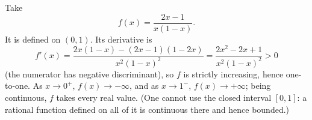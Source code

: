 Take
\[f(x)=\dfrac{2x-1}{x(1-x)}.\]
It is defined on $(0,1)$. Its derivative is
\[f'(x)=\dfrac{2x(1-x)-(2x-1)(1-2x)}{x^2(1-x)^2}=\dfrac{2x^2-2x+1}{x^2(1-x)^2}>0\]
(the numerator has negative discriminant), so $f$ is strictly increasing, hence one-to-one. As $x\to0^+$, $f(x)\to-\infty$, and as $x\to1^-$, $f(x)\to+\infty$; being continuous, $f$ takes every real value. (One cannot use the closed interval $[0,1]$: a rational function defined on all of it is continuous there and hence bounded.)
